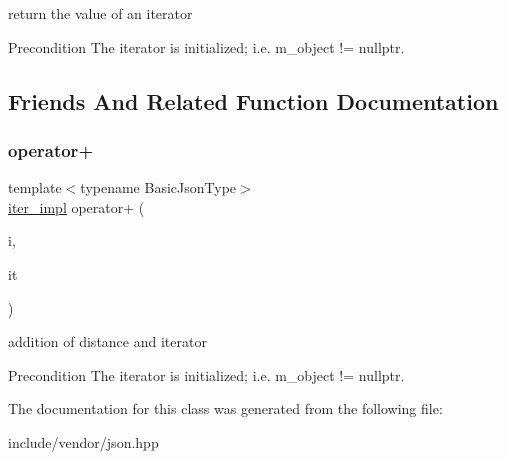 return the value of an iterator 

\begin{DoxyPrecond}{Precondition}
The iterator is initialized; i.\+e. {\ttfamily m\+\_\+object != nullptr}. 
\end{DoxyPrecond}


\subsection{Friends And Related Function Documentation}
\mbox{\label{classnlohmann_1_1detail_1_1iter__impl_a94108d1a7563e103534f23eb5c1ee175}} 
\subsubsection{\texorpdfstring{operator+}{operator+}}
{\footnotesize\ttfamily template$<$typename Basic\+Json\+Type$>$ \\
\mbox{\hyperlink{classnlohmann_1_1detail_1_1iter__impl}{iter\+\_\+impl}} operator+ (\begin{DoxyParamCaption}\item[{\mbox{\hyperlink{classnlohmann_1_1detail_1_1iter__impl_a2f7ea9f7022850809c60fc3263775840}{difference\+\_\+type}}}]{i,  }\item[{const \mbox{\hyperlink{classnlohmann_1_1detail_1_1iter__impl}{iter\+\_\+impl}}$<$ Basic\+Json\+Type $>$ \&}]{it }\end{DoxyParamCaption})\hspace{0.3cm}{\ttfamily [friend]}}



addition of distance and iterator 

\begin{DoxyPrecond}{Precondition}
The iterator is initialized; i.\+e. {\ttfamily m\+\_\+object != nullptr}. 
\end{DoxyPrecond}


The documentation for this class was generated from the following file\+:\begin{DoxyCompactItemize}
\item 
include/vendor/json.\+hpp\end{DoxyCompactItemize}
